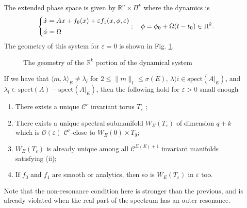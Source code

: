 The extended phase space is given by $\mathbb{R}^{n} \times \Pi^{k}$ where the dynamics is 
\begin{align}
\begin{dcases}
	\dot{x} = Ax + f_0(x) + \varepsilon f_1(x, \phi, \varepsilon) \\
	\dot{\phi} = \Omega 
\end{dcases}
;\quad \phi = \phi_0 + \Omega(t-t_0) \in \Pi^{k}.
\end{align}
The geometry of this system for $\varepsilon=0$ is shown in Fig. \ref{fig:ssm_eps0}.
\begin{figure}[h!]
	\centering
	\caption{The geometry of the $\mathbb{R}^{k}$ portion of the dynamical system}
	\label{fig:ssm_eps0}
\end{figure}
\begin{theorem}[]
If we have that $\langle m, \lambda \rangle_E \neq \lambda_l$ for $2 \leq \|m\|_{1} \leq \sigma(E)$, $\lambda)i \in  \textrm{spect} (A|_{E})$, and $\lambda_l \in  \textrm{spect} (A)- \textrm{spect} (A|_{E})$, then the following hold for $\varepsilon >0$ small enough
\begin{enumerate}
	\item There exists a unique $\mathcal{C}^{r}$ invariant torus $T_{\varepsilon}$ ;
	\item There exists a unique spectral submanifold $W_{E}(T_{\varepsilon})$ of dimension $q+k$ which is $\mathcal{O}(\varepsilon)$ $\mathcal{C}^{r}$-close to $W_{E}(0)\times T_0$;
	\item $W_{E}(T_{\varepsilon})$ is already unique among all $\mathcal{C}^{\Sigma(E) + 1}$ invariant manifolds satisfying (ii);
	\item If $f_0$ and $f_1$ are smooth or analytics, then so is $W_{E}(T_\varepsilon)$ in $\varepsilon$ too.
\end{enumerate}
\end{theorem}
\begin{remark}[]
	Note that the non-resonance condition here is stronger than the previous, and is already violated when the real part of the spectrum has an outer resonance.
\end{remark}

